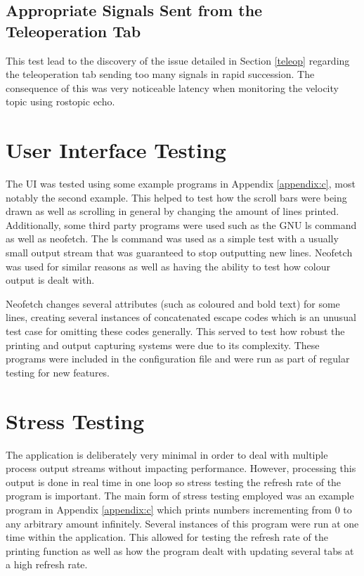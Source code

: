 \subsection{Appropriate Signals Sent from the Teleoperation Tab}

This test lead to the discovery of the issue detailed in Section \ref{teleop} regarding the teleoperation tab sending too many signals in rapid succession. The consequence of this was very noticeable latency when monitoring the velocity topic using {\selectfont rostopic echo}.

\section{User Interface Testing}

The UI was tested using some example programs in Appendix \ref{appendix:c}, most notably the second example. This helped to test how the scroll bars were being drawn as well as scrolling in general by changing the amount of lines printed. Additionally, some third party programs were used such as the {\selectfont GNU ls} command as well as {\selectfont neofetch}\cite{neofetch}. The {\selectfont ls} command was used as a simple test with a usually small output stream that was guaranteed to stop outputting new lines. {\selectfont Neofetch} was used for similar reasons as well as having the ability to test how colour output is dealt with. 

{\selectfont Neofetch} changes several attributes (such as coloured and bold text) for some lines, creating several instances of concatenated escape codes which is an unusual test case for omitting these codes generally. This served to test how robust the printing and output capturing systems were due to its complexity. These programs were included in the configuration file and were run as part of regular testing for new features.

\section{Stress Testing}

The application is deliberately very minimal in order to deal with multiple process output streams without impacting performance. However, processing this output is done in real time in one loop so stress testing the refresh rate of the program is important. The main form of stress testing employed was an example program in Appendix \ref{appendix:c} which prints numbers incrementing from 0 to any arbitrary amount infinitely. Several instances of this program were run at one time within the application. This allowed for testing the refresh rate of the printing function as well as how the program dealt with updating several tabs at a high refresh rate. 

